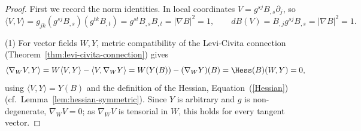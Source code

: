 \begin{proof}
First we record the norm identities. In local coordinates
$V=g^{sj}B_{,s}\partial_j$, so
$$\langle V,V\rangle
=g_{jk}\left(g^{sj}B_{,s}\right)\left(g^{tk}B_{,t}\right)
=g^{st}B_{,s}B_{,t}=|\nabla B|^2=1,
\qquad
dB(V)=B_{,j}g^{sj}B_{,s}=|\nabla B|^2=1.$$

(1) For vector fields $W,Y$, metric compatibility of the Levi-Civita
connection (Theorem~\ref{thm:levi-civita-connection}) gives
$$\langle\nabla_WV,Y\rangle
=W\langle V,Y\rangle-\langle V,\nabla_WY\rangle
=W(Y(B))-(\nabla_WY)(B)
=\Hess(B)(W,Y)=0,$$
using $\langle V,Y\rangle=Y(B)$ and the definition of the Hessian,
Equation~(\ref{Hessian}) (cf.\ Lemma~\ref{lem:hessian-symmetric}). Since
$Y$ is arbitrary and $g$ is non-degenerate, $\nabla_WV=0$; as
$\nabla_WV$ is tensorial in $W$, this holds for every tangent vector.


\end{proof}
